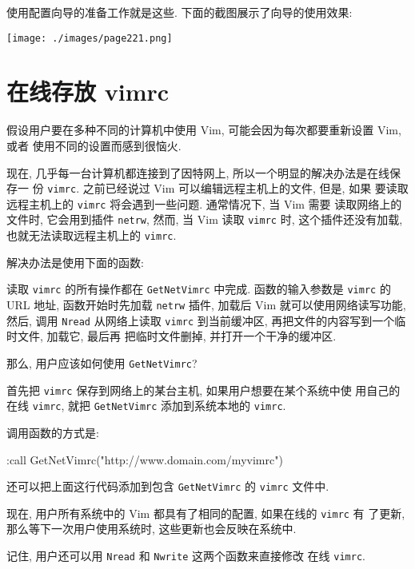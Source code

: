使用配置向导的准备工作就是这些. 下面的截图展示了向导的使用效果:
\begin{center}
\texttt{[image: ./images/page221.png]}
\end{center}

\section{在线存放 vimrc}
\label{sec:storing_vimrc_online}

假设用户要在多种不同的计算机中使用 Vim, 可能会因为每次都要重新设置 Vim, 或者
使用不同的设置而感到很恼火.

现在, 几乎每一台计算机都连接到了因特网上, 所以一个明显的解决办法是在线保存一
份 \texttt{vimrc}. 之前已经说过 Vim 可以编辑远程主机上的文件, 但是, 如果
要读取远程主机上的 \texttt{vimrc} 将会遇到一些问题. 通常情况下, 当 Vim 需要
读取网络上的文件时, 它会用到插件 \texttt{netrw}, 然而, 当 Vim 读取
\texttt{vimrc} 时, 这个插件还没有加载, 也就无法读取远程主机上的 \texttt{vimrc}.

解决办法是使用下面的函数:
读取 \texttt{vimrc} 的所有操作都在 \texttt{GetNetVimrc} 中完成. 函数的输入参数是
\texttt{vimrc} 的 URL 地址, 函数开始时先加载 \texttt{netrw} 插件, 加载后
Vim 就可以使用网络读写功能, 然后, 调用 \texttt{Nread} 从网络上读取
\texttt{vimrc} 到当前缓冲区, 再把文件的内容写到一个临时文件, 加载它, 最后再
把临时文件删掉, 并打开一个干净的缓冲区.

那么, 用户应该如何使用 \texttt{GetNetVimrc}?

首先把 \texttt{vimrc} 保存到网络上的某台主机, 如果用户想要在某个系统中使
用自己的在线 \texttt{vimrc}, 就把 \texttt{GetNetVimrc} 添加到系统本地的
\texttt{vimrc}.

调用函数的方式是:
\begin{vimcode}
:call GetNetVimrc("http://www.domain.com/myvimrc")
\end{vimcode}
还可以把上面这行代码添加到包含 \texttt{GetNetVimrc} 的 \texttt{vimrc} 文件中.

现在, 用户所有系统中的 Vim 都具有了相同的配置, 如果在线的 \texttt{vimrc} 有
了更新, 那么等下一次用户使用系统时, 这些更新也会反映在系统中.

记住, 用户还可以用 \texttt{Nread} 和 \texttt{Nwrite} 这两个函数来直接修改
在线 \texttt{vimrc}.

